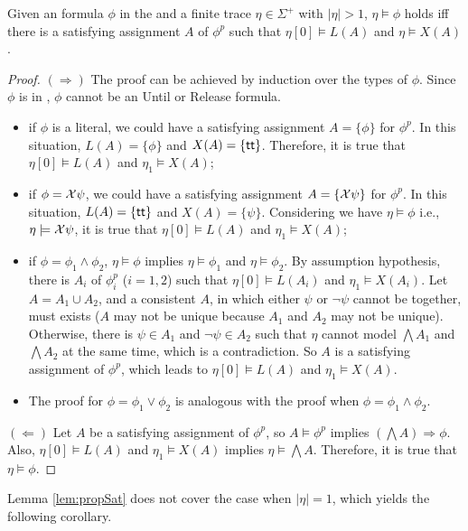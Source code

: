 \begin{lemma}\label{lem:propSat}
Given an \ltlf formula $\phi$ in the \XNF and a finite trace $\eta\in\Sigma^+$ with $|\eta|>1$, $\eta\models\phi$ holds iff there is a satisfying assignment $A$ of $\phi^p$ such that $\eta[0]\models L(A)$ and $\eta\models X(A)$.
\end{lemma}
\begin{proof}
$(\Rightarrow)$ The proof can be achieved by induction over the types of $\phi$. Since $\phi$ is in \XNF, $\phi$ cannot be an Until or Release formula.
\begin{itemize}
	\item if $\phi$ is a literal,  we could have a satisfying assignment $A=\{\phi\}$ for $\phi^p$. In this situation, $L(A)=\{\phi\}$ and $X(A)=\{\tt\}$. Therefore, it is true that $\eta[0]\models L(A)$ and $\eta_1\models X(A)$;
	\item if $\phi=\X\psi$, we could have a satisfying assignment $A=\{\X\psi\}$ for $\phi^p$. In this situation, $L(A)=\{\tt\}$ and $X(A)=\{\psi\}$. Considering we have $\eta\models\phi$ i.e., $\eta\models\X\psi$, it is true that $\eta[0]\models L(A)$ and $\eta_1\models X(A)$;
	\item if $\phi = \phi_1\wedge\phi_2$, $\eta\models\phi$ 
implies $\eta\models\phi_1$ and $\eta\models\phi_2$. By assumption hypothesis, there is $A_i$ of $\phi_i^p$ ($i=1,2$) such that 
$\eta[0]\models L(A_i)$ and $\eta_1\models X(A_i)$. Let $A = A_1\cup A_2$, and a consistent $A$, in which either $\psi$ or $\neg \psi$ cannot be together, 
must exists ($A$ may not be unique because $A_1$ and $A_2$ may not be unique). 
Otherwise, there is $\psi\in A_1$ and $\neg\psi\in A_2$ 
such that $\eta$ cannot model $\bigwedge A_1$ and $\bigwedge A_2$ at the same time, which is a contradiction. So $A$ is a satisfying  assignment of $\phi^p$, which leads to $\eta[0]\models L(A)$ and $\eta_1\models X(A)$. 
\item The proof for $\phi=\phi_1\vee\phi_2$ is analogous with the proof when $\phi = \phi_1\wedge\phi_2$.
\end{itemize} 

$(\Leftarrow)$ Let $A$ be a satisfying assignment of $\phi^p$, so $A\models\phi^p$ implies $(\bigwedge A)\Rightarrow \phi$. 
Also, $\eta[0]\models L(A)$ and $\eta_1\models X(A)$ implies $\eta\models \bigwedge A$. Therefore, it is true that $\eta\models \phi$.
\end{proof}

Lemma \ref{lem:propSat} does not cover the case when $|\eta|=1$, which yields the following corollary. 

